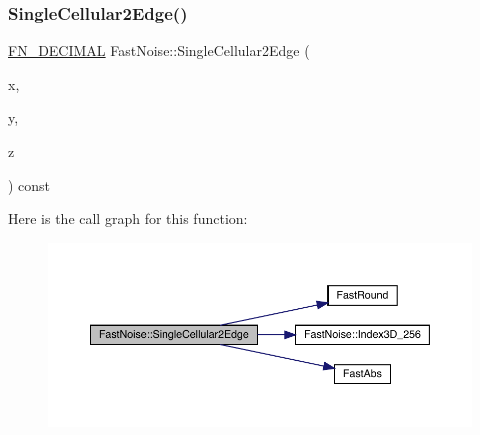 \subsubsection{\texorpdfstring{Single\+Cellular2\+Edge()}{SingleCellular2Edge()}\hspace{0.1cm}{\footnotesize\ttfamily [2/2]}}
{\footnotesize\ttfamily \mbox{\hyperlink{_fast_noise_8h_a75a9ef6d2541c4921815b885bfd449c3}{F\+N\+\_\+\+D\+E\+C\+I\+M\+AL}} Fast\+Noise\+::\+Single\+Cellular2\+Edge (\begin{DoxyParamCaption}\item[{\mbox{\hyperlink{_fast_noise_8h_a75a9ef6d2541c4921815b885bfd449c3}{F\+N\+\_\+\+D\+E\+C\+I\+M\+AL}}}]{x,  }\item[{\mbox{\hyperlink{_fast_noise_8h_a75a9ef6d2541c4921815b885bfd449c3}{F\+N\+\_\+\+D\+E\+C\+I\+M\+AL}}}]{y,  }\item[{\mbox{\hyperlink{_fast_noise_8h_a75a9ef6d2541c4921815b885bfd449c3}{F\+N\+\_\+\+D\+E\+C\+I\+M\+AL}}}]{z }\end{DoxyParamCaption}) const\hspace{0.3cm}{\ttfamily [private]}}

Here is the call graph for this function\+:
\nopagebreak
\begin{figure}[H]
\begin{center}
\leavevmode
\includegraphics[width=350pt]{class_fast_noise_a10e1d5c203e0d93b70f9f3aa4718e221_cgraph}
\end{center}
\end{figure}
\mbox{\label{class_fast_noise_a31ce14d8b90143da35b074d5fdeda85c}} 
